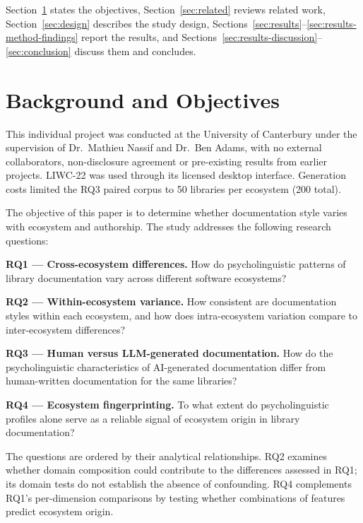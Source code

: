 \documentclass[conference]{IEEEtran}
\begin{document}
Section~\ref{sec:background} states the objectives, Section~\ref{sec:related} reviews related work, Section~\ref{sec:design} describes the study design, Sections~\ref{sec:results}--\ref{sec:results-method-findings} report the results, and Sections~\ref{sec:results-discussion}--\ref{sec:conclusion} discuss them and concludes.

\section{Background and Objectives}
\label{sec:background}

This individual project was conducted at the University of Canterbury under the supervision of Dr.~Mathieu Nassif and Dr.~Ben Adams, with no external collaborators, non-disclosure agreement or pre-existing results from earlier projects.  LIWC-22 was used through its licensed desktop interface. Generation costs limited the RQ3 paired corpus to 50 libraries per ecosystem (200 total).

The objective of this paper is to determine whether documentation style varies with ecosystem and authorship. The study addresses the following research questions:

\textbf{RQ1 --- Cross-ecosystem differences.} How do psycholinguistic patterns of
library documentation vary across different software ecosystems?

\textbf{RQ2 --- Within-ecosystem variance.} How consistent are documentation
styles within each ecosystem, and how does intra-ecosystem variation compare to
inter-ecosystem differences?

\textbf{RQ3 --- Human versus LLM-generated documentation.} How do the
psycholinguistic characteristics of AI-generated documentation differ from
human-written documentation for the same libraries?

\textbf{RQ4 --- Ecosystem fingerprinting.} To what extent do psycholinguistic
profiles alone serve as a reliable signal of ecosystem origin in library
documentation?

The questions are ordered by their analytical relationships. RQ2 examines whether domain composition could contribute to the differences assessed in RQ1; its domain tests do not establish the absence of confounding. RQ4 complements RQ1's per-dimension comparisons by testing whether combinations of features predict ecosystem origin.
\end{document}

